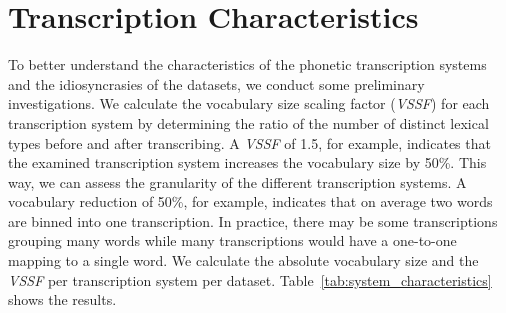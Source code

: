 \section{Transcription Characteristics}
To better understand the characteristics of the phonetic transcription systems and the idiosyncrasies of the datasets, we conduct some preliminary investigations.
We calculate the vocabulary size scaling factor (\textit{VSSF}) for each transcription system by determining the ratio of the number of distinct lexical types before and after transcribing.
A \textit{VSSF} of 1.5, for example, indicates that the examined transcription system increases the vocabulary size by 50\%.
This way, we can assess the granularity of the different transcription systems.
A vocabulary reduction of 50\%, for example, indicates that on average two words are binned into one transcription.
In practice, there may be some transcriptions grouping many words while many transcriptions would have a one-to-one mapping to a single word.
We calculate the absolute vocabulary size and the \textit{VSSF} per transcription system per dataset.
Table~\ref{tab:system_characteristics} shows the results.\\
